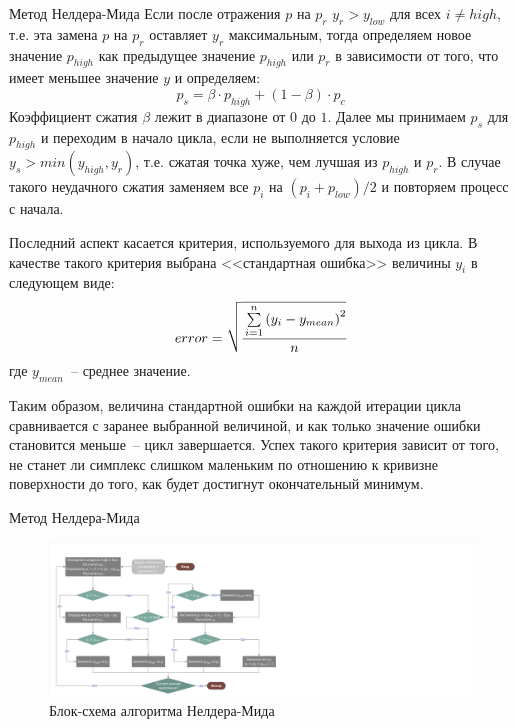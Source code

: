 \documentclass[aspectratio=169, mathserif]{beamer}	%
\begin{document}
\begin{frame}[fragile]{Метод Нелдера-Мида}
\scriptsize
Если после отражения $p$ на $p_r$ $y_r > y_{low}$ для всех $i \ne high$, т.е. эта замена $p$ на $p_r$ оставляет $y_r$ максимальным, тогда определяем новое значение $p_{high}$ как предыдущее значение $p_{high}$ или $p_r$ в зависимости от того, что имеет меньшее значение $y$ и определяем:
\begin{equation}\label{eq:contraction}
	p_s = \beta \cdot p_{high} + \left(1 - \beta\right) \cdot p_c
\end{equation}
Коэффициент сжатия $\beta$ лежит в диапазоне от $0$ до $1$. Далее мы принимаем $p_s$ для $p_{high}$ и переходим в начало цикла, если не выполняется условие $y_s > min\left(y_{high}, y_r\right)$, т.е. сжатая точка хуже, чем лучшая из $p_{high}$ и $p_r$. В случае такого неудачного сжатия заменяем  все $p_i$ на ${\left(p_i + p_{low}\right)}/{2}$ и повторяем процесс с начала.

Последний аспект касается критерия, используемого для выхода из цикла. В качестве такого критерия выбрана <<стандартная ошибка>> величины $y_i$ в следующем виде:
\begin{equation}\label{eq:stndard_error}
	error = \sqrt{\cfrac{\sum\limits_{i=1}^{n}\left(y_i - y_{mean}\right)^2}{n}}
\end{equation}
\noindent где $y_{mean}$~-- среднее значение.

Таким образом, величина стандартной ошибки на каждой итерации цикла сравнивается с заранее выбранной величиной, и как только значение ошибки становится меньше~-- цикл завершается. Успех такого критерия зависит от того, не станет ли симплекс слишком маленьким по отношению к кривизне поверхности до того, как будет достигнут окончательный минимум.
\vfill
\end{frame}


\begin{frame}[fragile]{Метод Нелдера-Мида}
\scriptsize
\begin{figure}[h!]
	\centering
	\includegraphics[width=.75\textwidth]{./pics/Nelder-Mead}
	\caption{Блок-схема алгоритма Нелдера-Мида}
	\label{fig:nelder_mead}
\end{figure}
\vfill
\end{frame}
\end{document}
